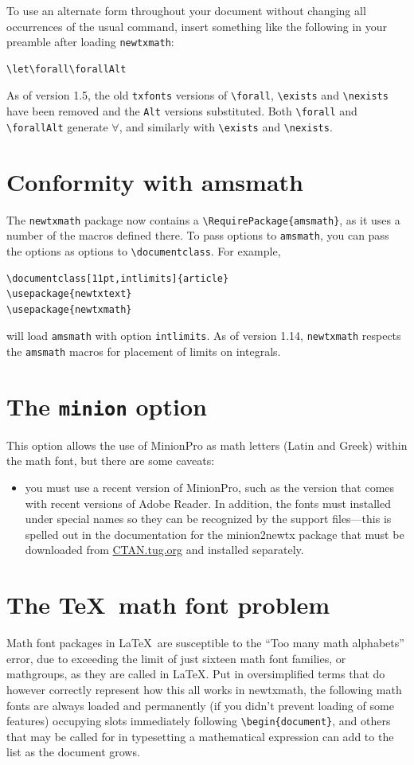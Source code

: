 \documentclass[11pt]{article}
\theoremstyle{oldplain}
\theoremstyle{plain}
\begin{document}
To use an alternate form throughout your document without changing all occurrences of the usual command, insert something like the following in your preamble after loading \texttt{newtxmath}:
\begin{verbatim}
\let\forall\forallAlt
\end{verbatim}
As of version 1.5, the old {\tt txfonts} versions of \verb|\forall|, \verb|\exists| and \verb|\nexists| have been removed and the {\tt Alt} versions substituted. Both \verb|\forall| and \verb|\forallAlt| generate $\forall$, and similarly with \verb|\exists| and \verb|\nexists|.

\section{Conformity with amsmath}
The {\tt newtxmath} package now contains a \verb|\RequirePackage{amsmath}|, as it uses a number of the macros defined there. To pass options to {\tt amsmath}, you can pass the options as options to \verb|\documentclass|. For example,
\begin{verbatim}
\documentclass[11pt,intlimits]{article}
\usepackage{newtxtext}
\usepackage{newtxmath}
\end{verbatim}
will load {\tt amsmath} with option {\tt intlimits}. As of version 1.14, {\tt newtxmath} respects the {\tt amsmath} macros for placement of limits on integrals.

\section{The {\tt minion} option}
This option allows the use of MinionPro as math letters (Latin and Greek) within  the math font, but there are some caveats:
\begin{itemize}
\item
you must use a recent version of MinionPro, such as the version that comes with recent versions of Adobe Reader. In addition, the fonts must installed under special names so they can be recognized by the support files---this is spelled out in the documentation for the minion2newtx package that must be downloaded from \url{CTAN.tug.org} and installed separately.
\end{itemize}

\section{The \TeX\ math font problem}
Math font packages in \LaTeX\ are susceptible to the ``Too many math alphabets'' error, due to exceeding the limit of just sixteen math font families, or mathgroups, as they are called in \LaTeX. Put in oversimplified terms that do however correctly represent how this all works in \textsf{newtxmath}, the following math fonts are always loaded and permanently (if you didn't prevent loading of some features) occupying slots immediately following \verb|\begin{document}|, and others that may be called for in typesetting a mathematical expression can add to the list as the document grows.
\end{document}
